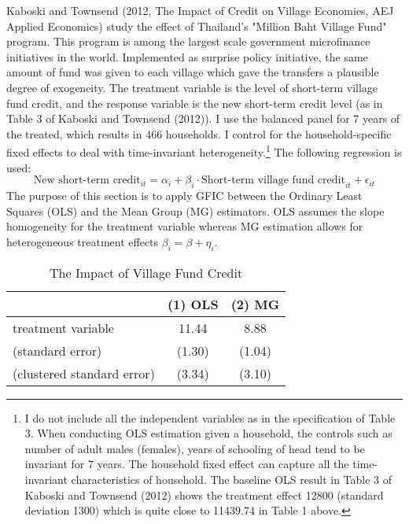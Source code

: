 Kaboski and Townsend (2012, The Impact of Credit on Village Economies, AEJ Applied Economics) study the effect of Thailand's "Million Baht Village Fund" program. 
This program is among the largest scale government microfinance initiatives in the world. 
Implemented as surprise policy initiative, the same amount of fund was given to each village which gave the transfers a plausible degree of exogeneity.
The treatment variable is the level of short-term village fund credit, and the response variable is the new short-term credit level (as in Table 3 of Kaboski and Townsend (2012)). 
I use the balanced panel for 7 years of the treated, which results in 466 households. 
I control for the household-specific fixed effects to deal with time-invariant heterogeneity.\footnote{I do not include all the independent variables as in the specification of Table 3. When conducting OLS estimation given a household, the controls such as number of adult males (females), years of schooling of head tend to be invariant for 7 years. The household fixed effect can capture all the time-invariant characteristics of household. The baseline OLS result in Table 3 of Kaboski and Townsend (2012) shows the treatment effect 12800 (standard deviation 1300) which is quite close to 11439.74 in Table 1 above.} 
The following regression is used:    
\[
\text{New short-term credit}_{it} = \alpha_i + \beta_i \cdot \text{Short-term village fund credit}_{it} + \epsilon_{it}
\]
The purpose of this section is to apply GFIC between the Ordinary Least Squares (OLS) and the Mean Group (MG) estimators. 
OLS assumes the slope homogeneity for the treatment variable whereas MG estimation allows for heterogeneous treatment effects $\beta_i = \beta + \eta_i$.  
    
\begin{table}[htbp]\centering
\caption{The Impact of Village Fund Credit}
\begin{tabular}{l  c c  }
\hline
\hline
& (1) OLS & (2) MG\\ \hline
treatment variable  &  11.44 & 8.88\\
(standard error) & (1.30) &  (1.04)\\
(clustered standard error) & (3.34)& (3.10)\\
\hline
\hline
\end{tabular}
\end{table}

